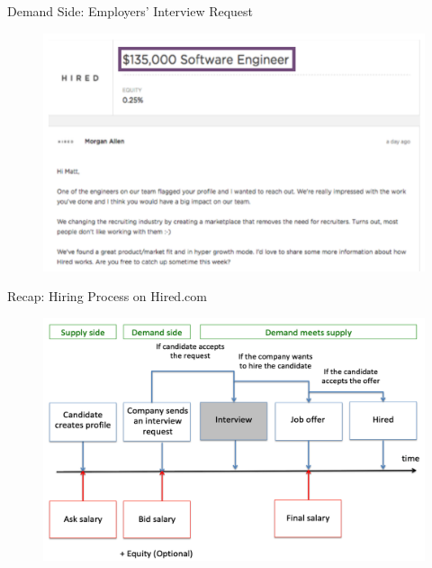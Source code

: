 \begin{frame}{Demand Side: Employers' Interview Request}
    \begin{figure}
        \centering
        \includegraphics[height = 0.75 \textheight]{images/employer.png}
    \end{figure}
\end{frame}

\begin{frame}{Recap: Hiring Process on Hired.com}
    \begin{figure}
        \centering
        \includegraphics[height = 0.7 \textheight]{images/hiringflow.png}
    \end{figure}
\end{frame}
